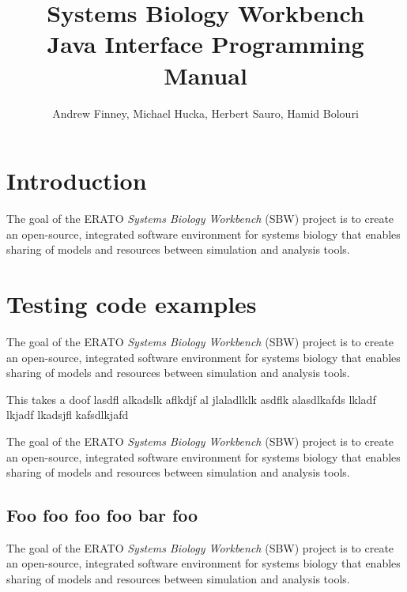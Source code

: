 \documentclass{cekmanual}
\begin{document}
\title{Systems Biology Workbench\\[5pt]
  Java Interface Programming Manual}

\author{Andrew Finney, Michael Hucka, Herbert Sauro, Hamid Bolouri}


\address{Systems Biology Workbench Development Group\\
  ERATO Kitano Symbiotic Systems Project\\
  Control and Dynamical Systems, MC 107-81\\
  California Institute of Technology, Pasadena, CA 91125, USA\\[3pt]
  {\url{http://www.cds.caltech.edu/erato}}}


\maketitlepage


\section{Introduction}

The goal of the ERATO \emph{Systems Biology Workbench} (SBW) project is to
create an open-source, integrated software environment for systems biology
that enables sharing of models and resources between simulation and
analysis tools.

\section{Testing code examples}


The goal of the ERATO \emph{Systems Biology Workbench} (SBW) project is to
create an open-source, integrated software environment for systems biology
that enables sharing of models and resources between simulation and
analysis tools.

{This takes a doof lasdfl alkadslk aflkdjf al jlaladlklk asdflk alasdlkafds
  lkladf lkjadf lkadsjfl kafsdlkjafd}


The goal of the ERATO \emph{Systems Biology Workbench} (SBW) project is to
create an open-source, integrated software environment for systems biology
that enables sharing of models and resources between simulation and
analysis tools.

\subsection{Foo foo foo foo bar foo}

The goal of the ERATO \emph{Systems Biology Workbench} (SBW) project is to
create an open-source, integrated software environment for systems biology
that enables sharing of models and resources between simulation and
analysis tools.
\end{document}
